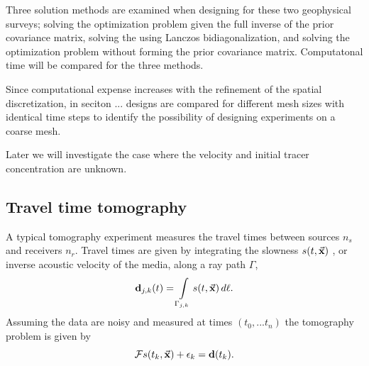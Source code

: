 \documentclass[12pt]{article}
\newcommand {\bfd}   { {\bf d} }
\newcommand {\vx}    {\vec {\bf x}}
\newcommand{\CF}  {\mathcal{F}}    %
\begin{document}
Three solution methods are examined when designing for these two geophysical surveys; solving the optimization problem given the full inverse of the prior covariance matrix, solving the using Lanczos bidiagonalization, and solving the optimization problem without forming the prior covariance matrix.  Computatonal time will be compared for the three methods.

Since computational expense increases with the refinement of the spatial discretization, in seciton ... designs are compared for different mesh sizes with identical time steps to identify the possibility of designing experiments on a coarse mesh. 



Later we will investigate the case where the velocity and initial tracer concentration are unknown. 

\subsection{Travel time tomography}
 A typical tomography experiment measures the travel times between sources $n_s$ and receivers $n_r$. Travel times are given by integrating the slowness  $s(t,\vx)$ , or inverse acoustic velocity of the media,  along a ray path $\Gamma$,
\begin{equation*}\label{eq:tomo}
\bfd_{j,k}(t) =  \int\limits_{\Gamma_{j,k}} s(t,\vx)\, d\ell.
\end{equation*}
 Assuming the data are noisy and measured at times $(t_0,...t_n)$ the tomography problem is given by 
 \begin{equation*}
 \CF s(t_{k},\vx) + \epsilon_{k}  = \bfd(t_{k}).\\
\end{equation*}
\end{document}
